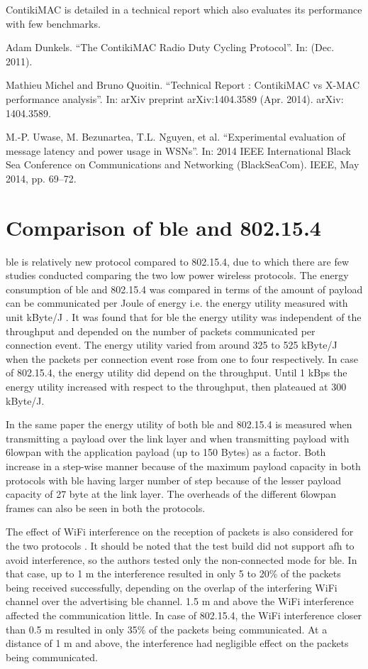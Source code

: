ContikiMAC is detailed in a technical report \cite{Dunkels2011} which also evaluates its performance with few benchmarks.

\cite{Dunkels2011}
Adam Dunkels. “The ContikiMAC Radio Duty Cycling Protocol”. In: (Dec. 2011).

\cite{Michel2014} Mathieu Michel and Bruno Quoitin. “Technical Report : ContikiMAC vs X-MAC performance analysis”. In: arXiv preprint arXiv:1404.3589 (Apr. 2014). arXiv: 1404.3589.

\cite{Uwase2014} M.-P. Uwase, M. Bezunartea, T.L. Nguyen, et al. “Experimental evaluation of message latency and power usage in WSNs”. In: 2014 IEEE International Black Sea Conference on Communications and Networking (BlackSeaCom). IEEE, May 2014,
pp. 69–72.

\section{Comparison of \gls{ble} and 802.15.4} \label{4ble802}

\gls{ble} is relatively new protocol compared to 802.15.4, due to which there are few studies conducted comparing the two low power wireless protocols. The energy consumption of \gls{ble} and 802.15.4 was compared in terms of the amount of payload can be communicated per Joule of energy i.e. the energy utility measured with unit kByte/J \cite{Siekkinen2012}. It was found that for \gls{ble} the energy utility was independent of the throughput and depended on the number of packets communicated per connection event. The energy utility varied from around 325 to 525 kByte/J when the packets per connection event rose from one to four respectively. In case of 802.15.4, the energy utility did depend on the throughput. Until 1 kBps the energy utility increased with respect to the throughput, then plateaued at 300 kByte/J. 

In the same paper \cite{Siekkinen2012} the energy utility of both \gls{ble} and 802.15.4 is measured when transmitting a payload over the link layer and when transmitting payload with \gls{6lowpan} with the application payload (up to 150 Bytes) as a factor. Both increase in a step-wise manner because of the maximum payload capacity in both protocols with \gls{ble} having larger number of step because of the lesser payload capacity of 27 byte at the link layer. The overheads of the different \gls{6lowpan} frames can also be seen in both the protocols. 

The effect of WiFi interference on the reception of packets is also considered for the two protocols \cite{Siekkinen2012}. It should be noted that the test build did not support \gls{afh} to avoid interference, so the authors tested only the non-connected mode for \gls{ble}. In that case, up to 1 m the interference resulted in only 5 to 20\% of the packets being received successfully, depending on the overlap of the interfering WiFi channel over the advertising \gls{ble} channel. 1.5 m and above the WiFi interference affected the communication little. In case of 802.15.4, the WiFi interference closer than 0.5 m resulted in only 35\% of the packets being communicated. At a distance of 1 m and above, the interference had negligible effect on the packets being communicated.

